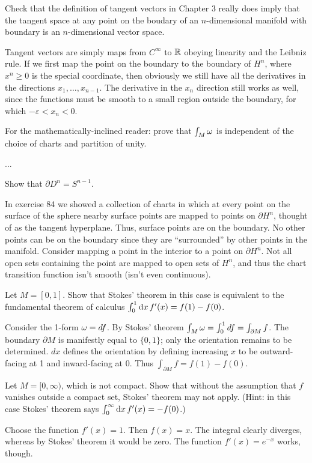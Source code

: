 \documentclass[a4paper,12pt]{report}
\numberwithin{equation}{section}
\begin{document}
\begin{p}%
{Check that the definition of tangent vectors in Chapter 3 really does imply that the tangent space at any point on the boudary of an $n$-dimensional manifold with boundary is an $n$-dimensional vector space.}
\end{p}
{Tangent vectors are simply maps from $C^\infty$ to $\mathbb{R}$ obeying linearity and the Leibniz rule. If we first map the point on the boundary to the boundary of $H^n$, where $x^n\geq 0$ is the special coordinate, 
then obviously 
we still have all the derivatives in the directions $x_1,\dots,x_{n{-}1}$. The derivative in the $x_n$ direction still works as well, since the functions must be smooth to a small region outside the boundary, for which $-\varepsilon<x_n<0$. }

\begin{p}%
{For the mathematically-inclined reader: prove that $\int_M\omega$ is independent of the 
choice of charts and partition of unity.}
\end{p}
...

\begin{p}%
{Show that $\partial D^n=S^{n{-}1}$.}
\end{p}
{In exercise 84 we showed a collection of charts in which
at every point on the surface of the sphere nearby surface points are mapped to points on $\partial H^n$, thought of as the tangent hyperplane. Thus, surface points are on the boundary. No other points can be on the boundary since they are ``surrounded'' by other points in the manifold. Consider mapping a point in the interior to a point on $\partial H^n$. Not all open sets containing the point are mapped to open sets of $H^n$, and thus the chart transition function isn't smooth (isn't even continuous).}

\begin{p}%
{Let $M=[0,1]$. Show that Stokes' theorem in this case is equivalent to the fundamental theorem
of calculus $\int_0^1 {\rm d}x\, f'(x)=f(1)-f(0)$.}
\end{p}
{Consider the 1-form $\omega=df$. By Stokes' theorem $\int_M \omega=\int_0^1 df=\int_{\partial M}f$. The boundary $\partial M$ is manifestly equal to $\{0,1\}$; only the orientation remains to be determined.  $dx$ defines the orientation by defining increasing $x$ to be outward-facing at 1 and inward-facing at 0. Thus $\int_{\partial M}f=f(1)-f(0)$.}

\begin{p}%
{Let $M=[0,\infty)$, which is not compact. Show that without the assumption that $f$ vanishes outside a compact set, Stokes' theorem may not apply. (Hint: in this case Stokes' theorem says $\int_0^\infty {\rm d}x\, f'(x)=-f(0)$.)}
\end{p}
{Choose the function $f'(x)=1$. Then $f(x)=x$. The integral clearly diverges, whereas 
by Stokes' theorem it would be zero. The function $f'(x)=e^{-x}$ works, though.}
\end{document}
